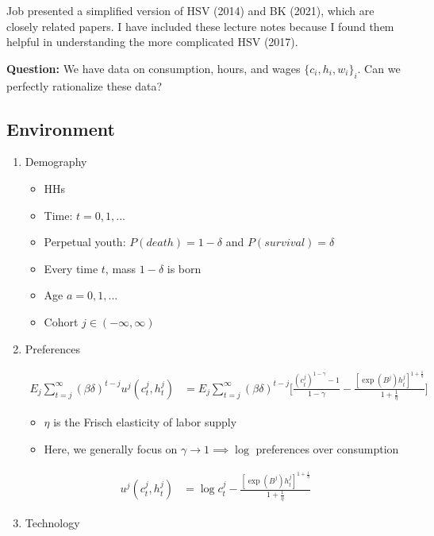 \documentclass{article}
\begin{document}
Job presented a simplified version of HSV (2014) and BK (2021), which are closely related papers. I have included these lecture notes because I found them helpful in understanding the more complicated HSV (2017). 

\bigskip

\textbf{Question:} We have data on consumption, hours, and wages $\{c_i, h_i, w_i\}_i$. Can we perfectly rationalize these data?

\subsection*{Environment}

\begin{enumerate}

\item Demography

\begin{itemize}
\item HHs
\item Time: $t=0,1,...$
\item Perpetual youth: $P(death) = 1 - \delta$ and $P(survival) = \delta$
\item Every time $t$, mass $1-\delta$ is born
\item Age $a = 0, 1,...$
\item Cohort $j \in (-\infty, \infty)$
\end{itemize}

\item Preferences

\begin{align*}
E_j \sum_{t=j}^\infty (\beta \delta)^{t-j} u^j(c_t^j, h_t^j) 
&= 
E_j \sum_{t=j}^\infty (\beta \delta)^{t-j} \Bigg[\frac{(c_t^j)^{1-\gamma}-1}{1-\gamma} - \frac{[\exp(B^j) h_t^j]^{1+\frac{1}{\eta}}}{1+\frac{1}{\eta}} \Bigg]
\end{align*}
\begin{itemize}
\item $\eta$ is the Frisch elasticity of labor supply
\item Here, we generally focus on $\gamma \to 1 \implies \log$ preferences over consumption
\end{itemize}
\begin{align*}
u^j(c_t^j, h_t^j) 
&= 
\log c_t^j - \frac{[\exp(B^j) h_t^j]^{1+\frac{1}{\eta}}}{1+\frac{1}{\eta}}
\end{align*}

\item Technology


\end{enumerate}
\end{document}
